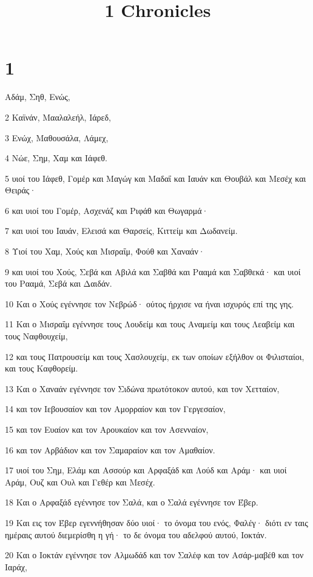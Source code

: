 

\title{1 Chronicles}


\chapter{1}

\par Αδάμ, Σηθ, Ενώς,
\par 2 Καϊνάν, Μααλαλεήλ, Ιάρεδ,
\par 3 Ενώχ, Μαθουσάλα, Λάμεχ,
\par 4 Νώε, Σημ, Χαμ και Ιάφεθ.
\par 5 υιοί του Ιάφεθ, Γομέρ και Μαγώγ και Μαδαΐ και Ιαυάν και Θουβάλ και Μεσέχ και Θειράς·
\par 6 και υιοί του Γομέρ, Ασχενάζ και Ριφάθ και Θωγαρμά·
\par 7 και υιοί του Ιαυάν, Ελεισά και Θαρσείς, Κιττείμ και Δωδανείμ.
\par 8 Υιοί του Χαμ, Χούς και Μισραΐμ, Φούθ και Χαναάν·
\par 9 και υιοί του Χούς, Σεβά και Αβιλά και Σαβθά και Ρααμά και Σαβθεκά· και υιοί του Ρααμά, Σεβά και Δαιδάν.
\par 10 Και ο Χούς εγέννησε τον Νεβρώδ· ούτος ήρχισε να ήναι ισχυρός επί της γης.
\par 11 Και ο Μισραΐμ εγέννησε τους Λουδείμ και τους Αναμείμ και τους Λεαβείμ και τους Ναφθουχείμ,
\par 12 και τους Πατρουσείμ και τους Χασλουχείμ, εκ των οποίων εξήλθον οι Φιλισταίοι, και τους Καφθορείμ.
\par 13 Και ο Χαναάν εγέννησε τον Σιδώνα πρωτότοκον αυτού, και τον Χετταίον,
\par 14 και τον Ιεβουσαίον και τον Αμορραίον και τον Γεργεσαίον,
\par 15 και τον Ευαίον και τον Αρουκαίον και τον Ασενναίον,
\par 16 και τον Αρβάδιον και τον Σαμαραίον και τον Αμαθαίον.
\par 17 υιοί του Σημ, Ελάμ και Ασσούρ και Αρφαξάδ και Λούδ και Αράμ· και υιοί Αράμ, Ουζ και Ουλ και Γεθέρ και Μεσέχ.
\par 18 Και ο Αρφαξάδ εγέννησε τον Σαλά, και ο Σαλά εγέννησε τον Έβερ.
\par 19 Και εις τον Έβερ εγεννήθησαν δύο υιοί· το όνομα του ενός, Φαλέγ· διότι εν ταις ημέραις αυτού διεμερίσθη η γή· το δε όνομα του αδελφού αυτού, Ιοκτάν.
\par 20 Και ο Ιοκτάν εγέννησε τον Αλμωδάδ και τον Σαλέφ και τον Ασάρ-μαβέθ και τον Ιαράχ,
